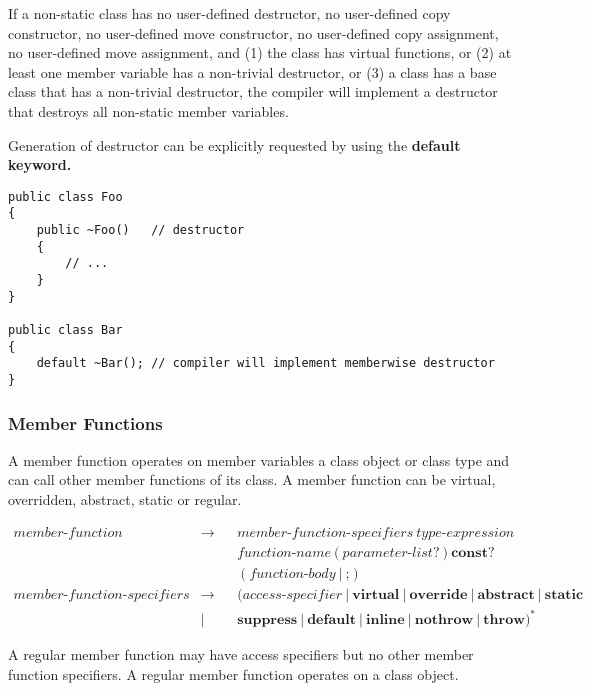 \documentclass[a4paper,oneside,11pt]{article}
\begin{document}
If a non-static class has no user-defined destructor,
no user-defined copy constructor, no user-defined move constructor, no user-defined copy assignment, no user-defined move assignment, and
(1) the class has virtual functions,
or (2) at least one member variable has a non-trivial destructor,
or (3) a class has a base class that has a non-trivial destructor,
the compiler will implement a destructor that destroys all non-static member variables.

Generation of destructor can be explicitly requested by using the \bf{default} keyword.

\begin{lstlisting}[frame=trBL]
public class Foo
{
    public ~Foo()   // destructor
    {
        // ...
    }
}

public class Bar
{
    default ~Bar(); // compiler will implement memberwise destructor
}
\end{lstlisting}

\subsubsection{Member Functions}\label{memberfunction}

A member function operates on member variables a class object or class type and can call
other member functions of its class.
A member function can be virtual, overridden, abstract, static or regular.

\begin{align*}
member\textrm{-}function &\rightarrow & &member\textrm{-}function\textrm{-}specifiers \> \hyperref[typeexpr]{type\textrm{-}expression}\\
& & &\hyperref[functionname]{function\textrm{-}name} \> \texttt{(} \> \hyperref[parameterlist]{parameter\textrm{-}list}? \> \texttt{)} \> \textbf{const}?\\
& & &(\hyperref[functionbody]{function\textrm{-}body} \> | \> \texttt{;})\\
member\textrm{-}function\textrm{-}specifiers &\rightarrow & &(\hyperref[accessspecifier]{access\textrm{-}specifier} \> | \> \textbf{virtual} \>
| \> \textbf{override} \> | \> \textbf{abstract} \> | \> \textbf{static} \>\\
&| & &\textbf{suppress} \> | \> \textbf{default} \> | \> \textbf{inline} \> | \> \textbf{nothrow} \> | \> \textbf{throw})^*
\end{align*}

A regular member function may have access specifiers but no other member function specifiers.
A regular member function operates on a class object.
\end{document}
